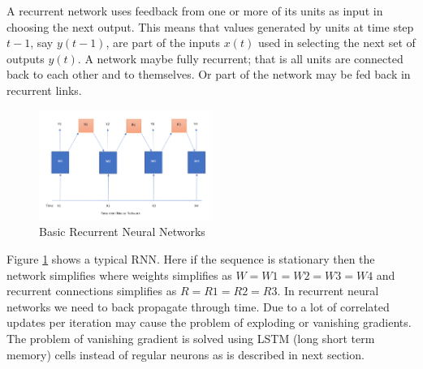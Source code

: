 \documentclass[conference]{IEEEtran}
\begin{document}
A recurrent network uses feedback from one or more of its units as input in choosing the next output. This means that values generated by units at time step $t-1$, say $y(t-1)$, are part of the inputs $x(t)$ used in selecting the next set of outputs $y(t)$. A network maybe fully recurrent; that is all units are connected back to each other and to themselves. Or part of the network may be fed back in recurrent links. \cite{judy1}\\

\begin{figure}[h]
\includegraphics[width=0.5\textwidth]{1.PNG}
\caption{Basic Recurrent Neural Networks}
\label{fig:figure7}
\end{figure}

Figure \ref{fig:figure7} shows a typical RNN. Here if the sequence is stationary then the network simplifies where weights simplifies as $W = W1 = W2 = W3 = W4$ and recurrent connections simplifies as $R = R1 = R2 = R3$.
In recurrent neural networks we need to back propagate through time. Due to a lot of correlated updates per iteration may cause the problem of exploding or vanishing gradients. The problem of vanishing gradient is solved using LSTM (long short term memory) cells instead of regular neurons as is described in next section.
\end{document}
